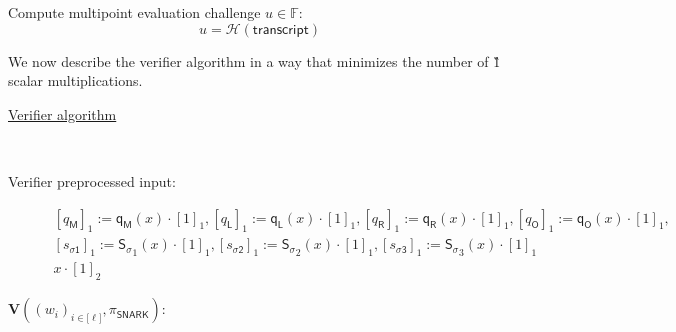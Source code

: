\documentclass[11pt]{article} %
\newcommand{\F}{\ensuremath{\mathbb F}\xspace}
\newcommand{\hash}{\ensuremath{\mathcal{H}}\xspace}
\newcommand{\ver}{\ensuremath{\mathsf{\mathbf{V}}}\xspace}
\newcommand{\sigpoly}{\ensuremath{\mathsf{S_{\sigma}}}\xspace}
\newcommand{\selmultpoly}{\ensuremath{\mathsf{q_M}}\xspace}
\newcommand{\selleftpoly}{\ensuremath{\mathsf{q_L}}\xspace}
\newcommand{\selrightpoly}{\ensuremath{\mathsf{q_R}}\xspace}
\newcommand{\seloutpoly}{\ensuremath{\mathsf{q_O}}\xspace}
\newcommand{\sigcomma}{\ensuremath{[s_{\mathsf{\sigma1}}]_1}\xspace}
\newcommand{\sigcommb}{\ensuremath{[s_{\mathsf{\sigma2}}]_1}\xspace}
\newcommand{\sigcommc}{\ensuremath{[s_{\mathsf{\sigma3}}]_1}\xspace}
\newcommand{\selleftcomm}{\ensuremath{[q_\mathsf{L}]_1}\xspace}
\newcommand{\selrightcomm}{\ensuremath{[q_\mathsf{R}]_1}\xspace}
\newcommand{\seloutcomm}{\ensuremath{[q_\mathsf{O}]_1}\xspace}
\newcommand{\selmultcomm}{\ensuremath{[q_\mathsf{M}]_1}\xspace}
\newcommand{\snark}{\ensuremath{\mathsf{snark}}\xspace}
\newcommand{\Verify}{\mathcal{V}}
\newcommand{\Vsnark}{\ver}%
\newcommand{\transcript}{\ensuremath{\mathsf{transcript}}\xspace}
\begin{document}
	Compute multipoint evaluation challenge $u \in \F:$
	$$
	u = \hash(\transcript)
	$$

	We now describe the verifier algorithm in a way that minimizes the number of \G1 scalar multiplications.
	\begin{description}
	\item[\underline{Verifier algorithm}] \ \\
	\item[Verifier preprocessed input:] 
	$$
	\begin{array}{l}
 \selmultcomm := \selmultpoly(x) \cdot [1]_1, \selleftcomm := \selleftpoly(x) \cdot [1]_1, \selrightcomm := \selrightpoly(x) \cdot [1]_1, \seloutcomm := \seloutpoly(x) \cdot [1]_1, \\
	\sigcomma := \sigpoly_1(x) \cdot [1]_1, \sigcommb := \sigpoly_2(x) \cdot [1]_1, \sigcommc := \sigpoly_3 (x)\cdot [1]_1 \\
	x \cdot [1]_2
	\end{array}
	$$
	\item[$\Vsnark((w_i)_{i \in {[}\ell{]}}, \pi_{\mathsf{SNARK}})$:] \ \\
\end{description}
\noindent
\end{document}
